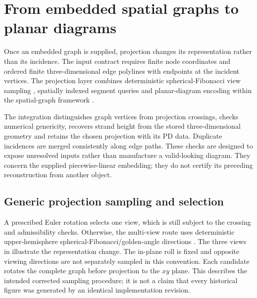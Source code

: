 
\section{From embedded spatial graphs to planar diagrams}
\label{supp:projection}
Once an embedded graph is supplied, projection changes its representation rather than its incidence. The input contract requires finite node coordinates and ordered finite three-dimensional edge polylines with endpoints at the incident vertices. The projection layer combines deterministic spherical-Fibonacci view sampling \cite{kg_keinert2015fibonacci}, spatially indexed segment queries \cite{kg_leutenegger1997str,kg_shapely} and planar-diagram encoding \cite{kg_mastin2015pdcode} within the spatial-graph framework \cite{kg_kauffman1989spatial,kg_flapan2017spatial}.

The integration distinguishes graph vertices from projection crossings, checks numerical genericity, recovers strand height from the stored three-dimensional geometry and retains the chosen projection with its PD data. Duplicate incidences are merged consistently along edge paths. These checks are designed to expose unresolved inputs rather than manufacture a valid-looking diagram. They concern the supplied piecewise-linear embedding; they do not certify its preceding reconstruction from another object.

\subsection{Generic projection sampling and selection}
\label{supp:projection_sampling}
A prescribed Euler rotation selects one view, which is still subject to the crossing and admissibility checks. Otherwise, the multi-view route uses deterministic upper-hemisphere spherical-Fibonacci/golden-angle directions \cite{kg_keinert2015fibonacci}. The three views in  illustrate the representation change. The in-plane roll is fixed and opposite viewing directions are not separately sampled in this convention. Each candidate rotates the complete graph before projection to the $xy$ plane. This describes the intended corrected sampling procedure; it is not a claim that every historical figure was generated by an identical implementation revision.

